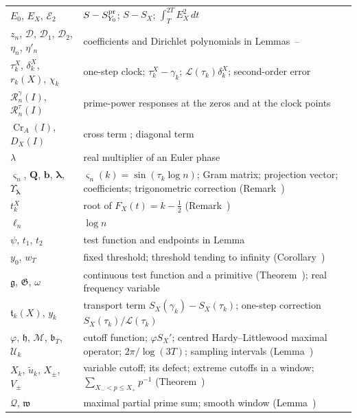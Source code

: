 \documentclass[preprint,12pt]{elsarticle}
\makeatletter
\let\CG@origref\ref
\let\CG@origeqref\eqref
\newcommand{\CG@gettip}[1]{\@ifundefined{CGTip@#1}{Reference: #1}{\csname CGTip@#1\endcsname}}
\DeclareRobustCommand{\CGref}[1]{\pdftooltip{\CG@origref{#1}}{\CG@gettip{#1}}}
\DeclareRobustCommand{\CGeqref}[1]{\pdftooltip{\CG@origeqref{#1}}{\CG@gettip{#1}}}
\numberwithin{equation}{section}
\theoremstyle{plain}
\theoremstyle{definition}
\theoremstyle{remark}
\newcommand{\lL}{\mathcal L}
\newcommand{\Cr}{\operatorname{Cr}}
\newcommand{\Rg}{\mathcal R^{\gamma}}
\newcommand{\Rt}{\mathcal R^{\tau}}
\makeatother
\begin{document}
\begin{center}
\begin{longtable}{p{}p{}}
$E_0$, $E_X$, $\mathcal E_2$ & $S-S^{\rm pr}_{Y_0}$; $S-S_X$; $\int_T^{2T}E_X^2\,dt$\\
$z_n$, $\mathcal D$, $\mathcal D_1$, $\mathcal D_2$, $\eta_n$, $\eta'_n$ & coefficients and Dirichlet polynomials in Lemmas~\CGref{lem:trig_MV}--\CGref{lem:D_moments}\\
$\tau_k^X$, $\delta_k^X$, $r_k(X)$, $\chi_k$ & one-step clock; $\tau_k^X-\gamma_k$; $\lL(\tau_k)\delta_k^X$; second-order error \CGeqref{eq:one_step_decomposition}\\
$\Rg_n(I)$, $\Rt_n(I)$ & prime-power responses at the zeros and at the clock points \CGeqref{eq:two_responses}\\
$\Cr_A(I)$, $D_X(I)$ & cross term \CGeqref{eq:Cr_def}; diagonal term \CGeqref{eq:full_factor_gain}\\
$\lambda$ & real multiplier of an Euler phase\\
$\varsigma_n$, $\mathbf Q$, $\mathbf b$, $\boldsymbol\lambda$, $\Upsilon_{\boldsymbol\lambda}$ & $\varsigma_n(k)=\sin(\tau_k\log n)$; Gram matrix; projection vector; coefficients; trigonometric correction (Remark~\CGref{rem:matrix_projection})\\
$t_k^X$ & root of $F_X(t)=k-\frac12$ (Remark~\CGref{rem:localization})\\
$\ell_n$ & $\log n$\\
$\psi$, $t_1$, $t_2$ & test function and endpoints in Lemma~\CGref{lem:first_moment_identity}\\
$y_0$, $w_T$ & fixed threshold; threshold tending to infinity (Corollary~\CGref{cor:dichotomy})\\
$\mathfrak g$, $\mathfrak G$, $\omega$ & continuous test function and a primitive (Theorem~\CGref{thm:identity_g}); real frequency variable\\
$\mathfrak t_k(X)$, $y_k$ & transport term $S_X(\gamma_k)-S_X(\tau_k)$; one-step correction $S_X(\tau_k)/\lL(\tau_k)$\\
$\varphi$, $\mathfrak h$, $\mathcal M$, $\mathfrak b_T$, $\mathcal U_k$ & cutoff function; $\varphi S_X'$; centred Hardy--Littlewood maximal operator; $2\pi/\log(3T)$; sampling intervals (Lemma~\CGref{lem:transport})\\
$X_k$, $\tilde u_k$, $X_\pm$, $V_\pm$ & variable cutoff; its defect; extreme cutoffs in a window; $\sum_{X_-<p\le X_+}p^{-1}$ (Theorem~\CGref{thm:variable_cutoff})\\
$\mathcal Q$, $\mathfrak w$ & maximal partial prime sum; smooth window (Lemma~\CGref{lem:maximal_primes})\\

\end{longtable}
\end{center}
\end{document}
